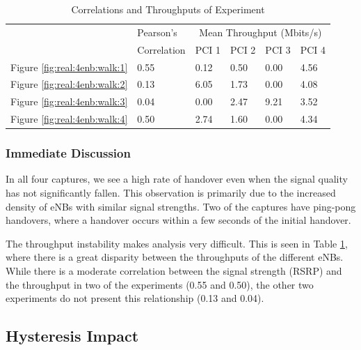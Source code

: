 \begin{table}[h]
\caption{Correlations and Throughputs of Experiment}
\label{tab:exp:4enb}
\centering
\begin{tabular}{@{}l|l|llll@{}}
\toprule
&Pearson's&\multicolumn{4}{c}{Mean Throughput (Mbits/s) } \\
         & Correlation & PCI 1 & PCI 2 & PCI 3 & PCI 4 \\ \midrule
Figure \ref{fig:real:4enb:walk:1} & 0.55                  & 0.12            & 0.50             & 0.00             & 4.56            \\
Figure \ref{fig:real:4enb:walk:2} & 0.13                 & 6.05            & 1.73            & 0.00              & 4.08            \\
Figure \ref{fig:real:4enb:walk:3} & 0.04                 & 0.00             & 2.47            & 9.21            & 3.52            \\
Figure \ref{fig:real:4enb:walk:4} & 0.50                  & 2.74            & 1.60             & 0.00              & 4.34            \\ \bottomrule
\end{tabular}
\end{table}

\subsubsection{Immediate Discussion}
In all four captures, we see a high rate of handover even when the signal quality has not significantly fallen. This observation is primarily due to the increased density of eNBs with similar signal strengths. Two of the captures have ping-pong handovers, where a handover occurs within a few seconds of the initial handover.

The throughput instability makes analysis very difficult. This is seen in Table \ref{tab:exp:4enb}, where there is a great disparity between the throughputs of the different eNBs. While there is a moderate correlation between the signal strength (RSRP) and the throughput in two of the experiments (0.55 and 0.50), the other two experiments do not present this relationship (0.13 and 0.04).




\subsection{Hysteresis Impact}
